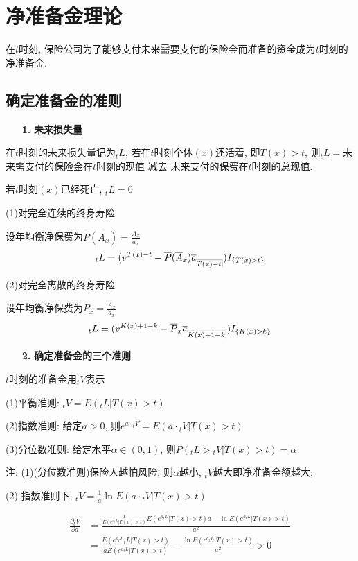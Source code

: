 \documentclass[a4paper,10pt]{ctexbook}
\makeatletter
\newcommand{\hei}{\CJKfamily{hei}}      %
\DeclareRobustCommand{\annu}[1]{_{%
    \def\arraystretch{0}%
    \setlength\arraycolsep{1pt}%
    \setlength\arrayrulewidth{.2pt}%
    \begin{array}[b]{@{}c|}\hline
        \\[\arraycolsep]%
        \scriptstyle #1%
    \end{array}%
}}
\makeatother
\begin{document}
\chapter{净准备金理论}

在$t$时刻, 保险公司为了能够支付未来需要支付的保险金而准备的资金成为$t$时刻的净准备金.
\section{确定准备金的准则}
\begin{itemize}
    \item[{\bf\hei 1.}]{\bf\hei 未来损失量}
\end{itemize}

在$t$时刻的未来损失量记为$_tL$, 若在$t$时刻个体$(x)$还活着, 即$T(x)>t$, 则$_tL=$未来需支付的保险金在$t$时刻的现值 减去 未来支付的保费在$t$时刻的总现值.

若$t$时刻$(x)$已经死亡, $_tL=0$

(1)对完全连续的终身寿险

设年均衡净保费为$\overline{P}( \overline{A}_x )=\frac{\overline A_x}{\overline a_x}$
$${}_tL=(v^{T(x)-t}-\overline{P}( \overline{A}_x )\overline a_{\annu {T(x)-t}})I_{\{T(x)>t\}}$$

(2)对完全离散的终身寿险

设年均衡净保费为$P_x=\frac{A_x}{\ddot{a}_x}$
$${}_tL=(v^{K(x)+1-k}-\overline{P}_x \overline a_{\annu {K(x)+1-k}})I_{\{K(x)>k\}}$$

\begin{itemize}
    \item[{\bf\hei  2.}]{\bf\hei 确定准备金的三个准则}
\end{itemize}

$t$时刻的准备金用${}_tV$表示

(1)平衡准则: ${}_tV=E({}_tL|T(x)>t)$

(2)指数准则: 给定$a>0$, 则$e^{a\cdot{}_tV}=E(a\cdot{}_tV|T(x)>t)$

(3)分位数准则: 给定水平$\alpha\in(0,1)$, 则$P({}_tL>{}_tV|T(x)>t)=\alpha$

注: (1)(分位数准则)保险人越怕风险, 则$\alpha$越小, $_tV$越大即净准备金额越大;

(2) 指数准则下, ${}_tV=\frac{1}{a}\ln E(a\cdot{}_tV|T(x)>t)$

\begin{align*}
    \frac{\partial {}_tV}{\partial a} & = \frac{\frac{1}{E(e^{a{}_tL}|T( x ) >t )}E( e^{a{}_tL}|T( x ) >t ) a-\ln E( e^{a{}_tL}|T( x ) >t )}{a^2}      \\
                                      & =\frac{E( e^{a{}_tL}{}_tL|T( x ) >t )}{aE( e^{a{}_tL}|T( x ) >t )}-\frac{\ln E( e^{a{}_tL}|T( x ) >t )}{a^2}>0 \\
\end{align*}
\end{document}
